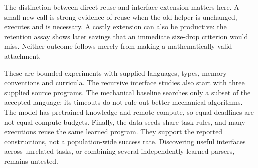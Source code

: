 \documentclass[11pt]{article}
\begin{document}
The distinction between direct reuse and interface extension matters here.
A small new call is strong evidence of reuse when the old helper is unchanged,
executes and is necessary. A costly extension can also be productive: the
retention assay shows later savings that an immediate size-drop criterion would
miss. Neither outcome follows merely from making a mathematically valid
attachment.

These are bounded experiments with supplied languages, types, memory conventions
and curricula. The recursive interface studies also start with three supplied
source programs. The mechanical baseline searches only a subset of the accepted
language; its timeouts do not rule out better mechanical algorithms. The model
has pretrained knowledge and remote compute, so equal deadlines are not equal
compute budgets. Finally, the data seeds share task rules, and many executions
reuse the same learned program. They support the reported constructions, not a
population-wide success rate. Discovering useful interfaces across unrelated
tasks, or combining several independently learned parsers, remains untested.

\begingroup
\small


\endgroup
\end{document}
